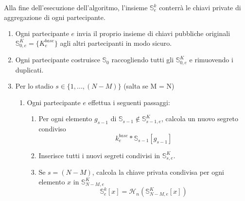 Alla fine dell'esecuzione dell'algoritmo, l'insieme $\mathbb{S}^{k}_{e}$ conterrà le chiavi private di aggregazione di ogni partecipante.
\begin{enumerate}
    \item Ogni partecipante $e$ invia il proprio insieme di chiavi pubbliche originali $\mathbb{S}^K_{0,e} = \{K^{base}_e\}$ agli altri partecipanti in modo sicuro.
    \item Ogni partecipante costruisce $\mathbb{S}_{0}$ raccogliendo tutti gli $\mathbb{S}^K_{0,e}$ e rimuovendo i duplicati.
    \item Per lo stadio $s \in \{1,...,(N-M)\}$ (salta se M = N)
    \begin{enumerate}
        \item Ogni partecipante $e$ effettua i seguenti passaggi:
        \begin{enumerate}
            \item Per ogni elemento $g_{s-1}$ di $\mathbb{S}_{s-1} \notin \mathbb{S}^K_{s-1,e}$, calcola un nuovo segreto condiviso \[k^{base}_e*\mathbb{S}_{s-1}[g_{s-1}]\]
            \item Inserisce tutti i nuovi segreti condivisi in $\mathbb{S}^K_{s,e}$.
            \item Se $s = (N-M)$, calcola la chiave privata condivisa per ogni elemento $x$ in $\mathbb{S}^K_{N-M,e}$
            \[\mathbb{S}^{k}_{e}[x] = \mathcal{H}_n(\mathbb{S}^K_{N-M,e}[x])\]


\end{enumerate}
\end{enumerate}
\end{enumerate}
